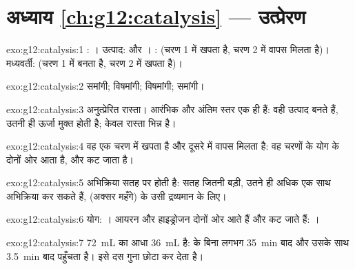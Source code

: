 \section*{अध्याय \ref{ch:g12:catalysis} --- उत्प्रेरण}

\begin{solution}{exo:g12:catalysis:1}
: । उत्पाद:  और । : 
(चरण 1 में खपता है, चरण 2 में वापस मिलता है)। मध्यवर्ती:  (चरण 1 में
बनता है, चरण 2 में खपता है)।
\end{solution}

\begin{solution}{exo:g12:catalysis:2}
समांगी; विषमांगी; विषमांगी; समांगी।
\end{solution}

\begin{solution}{exo:g12:catalysis:3}
अनुत्प्रेरित रास्ता। आरंभिक और अंतिम स्तर एक ही हैं: वही
उत्पाद बनते हैं, उतनी ही ऊर्जा मुक्त होती है; केवल रास्ता भिन्न है।
\end{solution}

\begin{solution}{exo:g12:catalysis:4}
वह एक चरण में खपता है और दूसरे में वापस मिलता है: वह चरणों के योग के दोनों
ओर आता है, और कट जाता है।
\end{solution}

\begin{solution}{exo:g12:catalysis:5}
अभिक्रिया सतह पर होती है: सतह जितनी बड़ी, उतने ही अधिक
 एक साथ अभिक्रिया कर सकते हैं, (अक्सर महँगे)  के
उसी द्रव्यमान के लिए।
\end{solution}

\begin{solution}{exo:g12:catalysis:6}
योग: । आयरन  और हाइड्रोजन  दोनों
ओर आते हैं और कट जाते हैं: ।
\end{solution}

\begin{solution}{exo:g12:catalysis:7}
\qty{72}{mL} का आधा \qty{36}{mL} है:  के बिना लगभग \qty{35}{min} बाद
और उसके साथ \qty{3.5}{min} बाद पहुँचता है।  इसे दस
गुना छोटा कर देता है।
\end{solution}

